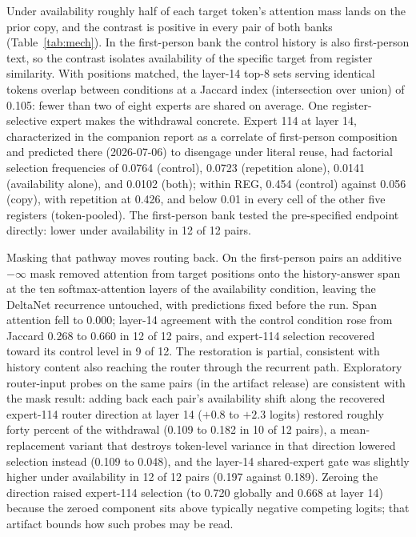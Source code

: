 \documentclass[10pt,a4paper,twocolumn]{article}
\begin{document}
Under availability roughly half of each target token's attention mass lands
on the prior copy, and the contrast is positive in every pair of both banks
(Table~\ref{tab:mech}). In the first-person bank the control history is also
first-person text, so the contrast isolates availability of the specific
target from register similarity. With positions matched, the layer-14 top-8
sets serving identical tokens overlap between conditions at a Jaccard index
(intersection over union) of 0.105: fewer than two of eight experts are
shared on average. One register-selective
expert makes the withdrawal concrete. Expert 114 at layer 14, characterized in
the companion report as a correlate of first-person composition
\cite{shorthill2026} and predicted there (2026-07-06) to disengage under
literal reuse, had factorial selection frequencies of 0.0764 (control), 0.0723
(repetition alone), 0.0141 (availability alone), and 0.0102 (both); within
REG, 0.454 (control) against 0.056 (copy), with repetition at 0.426, and below
0.01 in every cell of the other five registers (token-pooled). The
first-person bank tested the pre-specified endpoint directly: lower under
availability in 12 of 12 pairs.

Masking that pathway moves routing back. On the first-person pairs an
additive \(-\infty\) mask removed attention from target positions onto the
history-answer span at the ten softmax-attention layers of the availability
condition, leaving the DeltaNet recurrence untouched, with predictions fixed
before the run. Span attention fell to 0.000; layer-14 agreement with the
control condition rose from Jaccard 0.268 to 0.660 in 12 of 12 pairs, and
expert-114 selection recovered toward its control level in 9 of 12. The
restoration is partial, consistent with history content also reaching the
router through the recurrent path. Exploratory router-input probes on the same
pairs (in the artifact release) are consistent with the mask result: adding
back each pair's availability shift along the recovered expert-114 router
direction at layer 14 (\(+0.8\) to \(+2.3\) logits) restored roughly forty
percent of the withdrawal (0.109 to 0.182 in 10 of 12 pairs), a
mean-replacement variant that destroys token-level variance in that direction
lowered selection instead (0.109 to 0.048), and the layer-14 shared-expert
gate was slightly higher under availability in 12 of 12 pairs (0.197 against
0.189). Zeroing the direction raised expert-114 selection (to 0.720 globally
and 0.668 at layer 14) because the zeroed component sits above typically
negative competing logits; that artifact bounds how such probes may be read.
\end{document}
